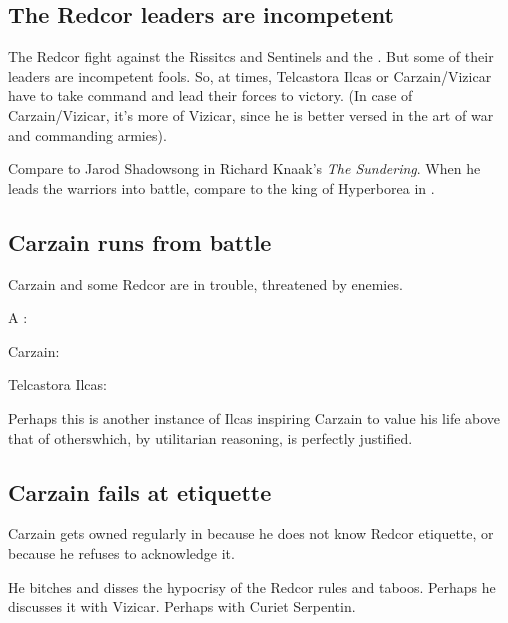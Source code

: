 \begin{garbage}
\subsection{The Redcor leaders are incompetent}
The Redcor fight against the Rissitcs and Sentinels and the \Haskelek. But some of their leaders are incompetent fools. So, at times, Telcastora Ilcas or Carzain/Vizicar have to take command and lead their forces to victory. (In case of Carzain/Vizicar, it's more of Vizicar, since he is better versed in the art of war and commanding armies). 

Compare to Jarod Shadowsong in Richard Knaak's \emph{The Sundering}. When he leads the warriors into battle, compare to the king of Hyperborea in . 







\subsection{Carzain runs from battle}
Carzain and some Redcor are in trouble, threatened by enemies. 

A \gandierre: 

Carzain: 

Telcastora Ilcas: 

Perhaps this is another instance of Ilcas inspiring Carzain to value his life above that of others\dash which, by utilitarian reasoning, is perfectly justified. 







\subsection{Carzain fails at etiquette}
Carzain gets owned regularly in \Redce{} because he does not know Redcor etiquette, or because he refuses to acknowledge it. 

He bitches and disses the hypocrisy of the Redcor rules and taboos. Perhaps he discusses it with Vizicar. Perhaps with Curiet Serpentin. 








\end{garbage}
